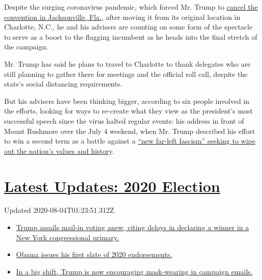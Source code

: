 Despite the surging coronavirus pandemic, which forced Mr. Trump to
\href{https://www.nytimes.com/2020/07/23/us/politics/jacksonville-rnc.html}{cancel
the convention in Jacksonville, Fla.}, after moving it from its original
location in Charlotte, N.C., he and his advisers are counting on some
form of the spectacle to serve as a boost to the flagging incumbent as
he heads into the final stretch of the campaign.

Mr. Trump has said he plans to travel to Charlotte to thank delegates
who are still planning to gather there for meetings and the official
roll call, despite the state's social distancing requirements.

But his advisers have been thinking bigger, according to six people
involved in the efforts, looking for ways to re-create what they view as
the president's most successful speech since the virus halted regular
events: his address in front of Mount Rushmore over the July 4 weekend,
when Mr. Trump described his effort to win a second term as a battle
against a
\href{https://www.nytimes.com/2020/07/03/us/politics/trump-coronavirus-mount-rushmore.html}{``new
far-left fascism'' seeking to wipe out the nation's values and history}.

\hypertarget{latest-updates-2020-election}{%
\section{\texorpdfstring{\href{https://www.nytimes.com/2020/08/03/us/elections/biden-vs-trump.html?action=click\&pgtype=Article\&state=default\&region=MAIN_CONTENT_1\&context=storylines_live_updates}{Latest
Updates: 2020
Election}}{Latest Updates: 2020 Election}}\label{latest-updates-2020-election}}

Updated 2020-08-04T01:23:51.312Z

\begin{itemize}
\tightlist
\item
  \href{https://www.nytimes.com/2020/08/03/us/elections/biden-vs-trump.html?action=click\&pgtype=Article\&state=default\&region=MAIN_CONTENT_1\&context=storylines_live_updates\#link-6494b448}{Trump
  assails mail-in voting anew, citing delays in declaring a winner in a
  New York congressional primary.}
\item
  \href{https://www.nytimes.com/2020/08/03/us/elections/biden-vs-trump.html?action=click\&pgtype=Article\&state=default\&region=MAIN_CONTENT_1\&context=storylines_live_updates\#link-3de249e6}{Obama
  issues his first slate of 2020 endorsements.}
\item
  \href{https://www.nytimes.com/2020/08/03/us/elections/biden-vs-trump.html?action=click\&pgtype=Article\&state=default\&region=MAIN_CONTENT_1\&context=storylines_live_updates\#link-54e34d20}{In
  a big shift, Trump is now encouraging mask-wearing in campaign
  emails.}
\end{itemize}

